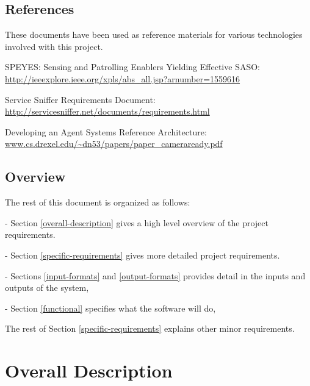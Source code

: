 \documentclass[titlepage]{article}
\begin{document}

\subsection{References%
  \label{references}%
}

These documents have been used as reference materials for various technologies involved with this project.
%
\begin{itemize*}
	\item SPEYES: Sensing and Patrolling Enablers Yielding Effective SASO: \url{http://ieeexplore.ieee.org/xpls/abs_all.jsp?arnumber=1559616}
	\item Service Sniffer Requirements Document: \url{http://servicesniffer.net/documents/requirements.html}
    \item Developing an Agent Systems Reference Architecture: \url{www.cs.drexel.edu/~dn53/papers/paper_cameraready.pdf}
\end{itemize*}



\subsection{Overview%
  \label{overview}%
}

The rest of this document is organized as follows: 
\begin{itemize*}
	\item[-]Section \ref{overall-description} gives a high level overview of the project requirements.  
	\item[-]Section \ref{specific-requirements} gives more detailed project requirements.  
	\item[-]Sections \ref{input-formats} and \ref{output-formats} provides detail in the inputs and outputs of the system, 
	\item[-]Section \ref{functional} specifies what the software will do, 
\end{itemize*}
The rest of Section \ref{specific-requirements} explains other minor requirements.



\section{Overall Description%
  \label{overall-description}%
}
\end{document}
